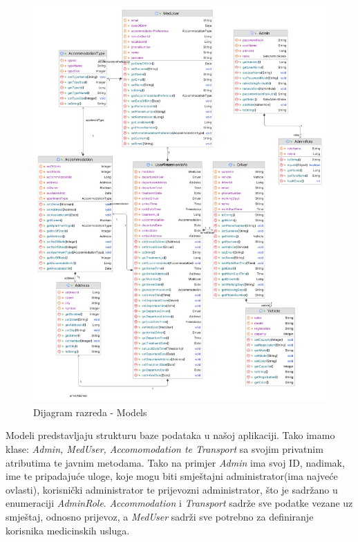 			\begin{figure}[H]
				\includegraphics[width=\textwidth]{slike/domain.PNG}
				\caption{Dijagram razreda - Models}
				\label{domainDiagram}
			\end{figure}
			
			{Modeli predstavljaju strukturu baze podataka u našoj aplikaciji. Tako imamo klase: \textit{Admin, MedUser, Accomomodation te Transport} sa svojim privatnim atributima te javnim metodama. Tako na primjer \textit{Admin} ima svoj ID, nadimak, ime te pripadajuće uloge, koje mogu biti smještajni administrator(ima najveće ovlasti), korisnički administrator te prijevozni administrator, što je sadržano u enumeraciji \textit{AdminRole}. \textit{Accommodation} i \textit{Transport} sadrže sve podatke vezane uz smještaj, odnosno prijevoz, a \textit{MedUser} sadrži sve potrebno za definiranje korisnika medicinskih usluga. }\\
			
